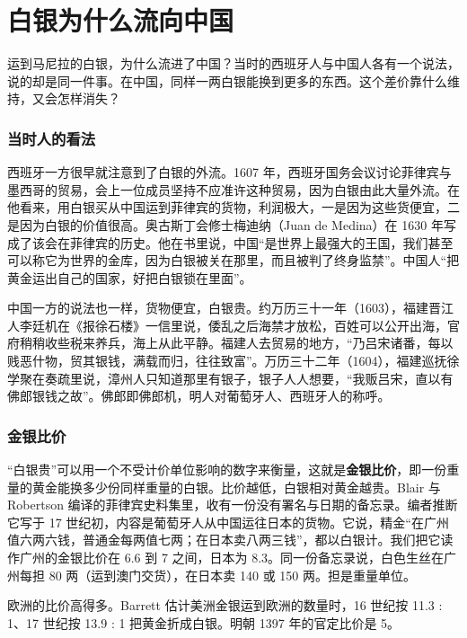 \section{白银为什么流向中国}\label{sec:silver-china}

运到马尼拉的白银，为什么流进了中国？当时的西班牙人与中国人各有一个说法，说的却是同一件事。在中国，同样一两白银能换到更多的东西。这个差价靠什么维持，又会怎样消失？

\subsubsection{当时人的看法}
西班牙一方很早就注意到了白银的外流。1607 年，西班牙国务会议讨论菲律宾与墨西哥的贸易，会上一位成员坚持不应准许这种贸易，因为白银由此大量外流。在他看来，用白银买从中国运到菲律宾的货物，利润极大，一是因为这些货便宜，二是因为白银的价值很高\cite{br}。奥古斯丁会修士梅迪纳（Juan de Medina）在 1630 年写成了该会在菲律宾的历史。他在书里说，中国“是世界上最强大的王国，我们甚至可以称它为世界的金库，因为白银被关在那里，而且被判了终身监禁”。中国人“把黄金运出自己的国家，好把白银锁在里面”\cite{br}。

中国一方的说法也一样，货物便宜，白银贵。约万历三十一年（1603），福建晋江人李廷机在《报徐石楼》一信里说，倭乱之后海禁才放松，百姓可以公开出海，官府稍稍收些税来养兵，海上从此平静。福建人去贸易的地方，“乃吕宋诸番，每以贱恶什物，贸其银钱，满载而归，往往致富”\cite{huangmingjingshiwenbian}。万历三十二年（1604），福建巡抚徐学聚在奏疏里说，漳州人只知道那里有银子，银子人人想要，“我贩吕宋，直以有佛郎银钱之故”\cite{huangmingjingshiwenbian}。佛郎即佛郎机，明人对葡萄牙人、西班牙人的称呼。

\subsubsection{金银比价}
“白银贵”可以用一个不受计价单位影响的数字来衡量，这就是\textbf{金银比价}，即一份重量的黄金能换多少份同样重量的白银。比价越低，白银相对黄金越贵。Blair 与 Robertson 编译的菲律宾史料集里，收有一份没有署名与日期的备忘录。编者推断它写于 17 世纪初，内容是葡萄牙人从中国运往日本的货物。它说，精金“在广州值六两六钱，普通金每两值七两；在日本卖八两三钱”，都以白银计\cite{br}。我们把它读作广州的金银比价在 6.6 到 7 之间，日本为 8.3。同一份备忘录说，白色生丝在广州每担 80 两（运到澳门交货），在日本卖 140 或 150 两\cite{br}。担是重量单位。

欧洲的比价高得多。Barrett 估计美洲金银运到欧洲的数量时，16 世纪按 11.3 : 1、17 世纪按 13.9 : 1 把黄金折成白银\cite{em2019}。明朝 1397 年的官定比价是 5。

